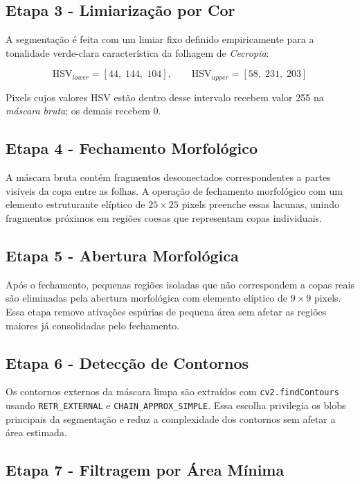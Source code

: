 \documentclass[12pt, a4paper]{article}
\begin{document}
\subsection{Etapa 3 - Limiarização por Cor}

A segmentação é feita com um limiar fixo definido empiricamente para a tonalidade
verde-clara característica da folhagem de \textit{Cecropia}:

\begin{equation}
    \text{HSV}_{lower} = [44,\; 144,\; 104], \qquad
    \text{HSV}_{upper} = [58,\; 231,\; 203]
\end{equation}

Pixels cujos valores HSV estão dentro desse intervalo recebem valor 255 na
\textit{máscara bruta}; os demais recebem 0.

\subsection{Etapa 4 - Fechamento Morfológico}

A máscara bruta contém fragmentos desconectados correspondentes a partes visíveis
da copa entre as folhas. A operação de fechamento morfológico com um elemento
estruturante elíptico de $25 \times 25$ pixels preenche essas lacunas, unindo
fragmentos próximos em regiões coesas que representam copas individuais.

\subsection{Etapa 5 - Abertura Morfológica}

Após o fechamento, pequenas regiões isoladas que não correspondem a copas reais
são eliminadas pela abertura morfológica com elemento elíptico de $9 \times 9$
pixels. Essa etapa remove ativações espúrias de pequena área sem afetar as
regiões maiores já consolidadas pelo fechamento.

\subsection{Etapa 6 - Detecção de Contornos}

Os contornos externos da máscara limpa são extraídos com \texttt{cv2.findContours}
usando \texttt{RETR\_EXTERNAL} e \texttt{CHAIN\_APPROX\_SIMPLE}. Essa escolha
privilegia os blobs principais da segmentação e reduz a complexidade dos
contornos sem afetar a área estimada.

\subsection{Etapa 7 - Filtragem por Área Mínima}
\end{document}
